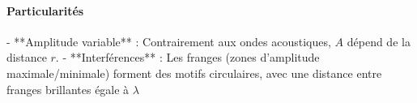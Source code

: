\paragraph{Particularités}
- **Amplitude variable** : Contrairement aux ondes acoustiques, \(A\) dépend de la distance \(r\).
- **Interférences** : Les franges (zones d'amplitude maximale/minimale) forment des motifs circulaires, avec une distance entre franges brillantes égale à \(\lambda\)



















%
%
%
%
%
%

